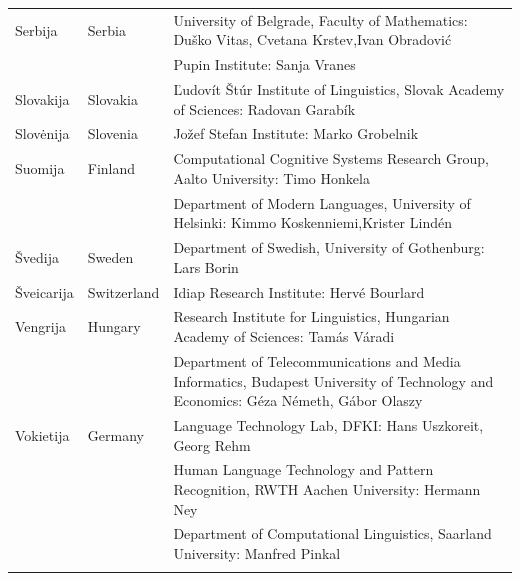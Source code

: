 \begin{longtable}{llp{113mm}}
  Serbija & \textcolor{grey1}{Serbia} & University of Belgrade, Faculty of Mathematics: Duško Vitas, Cvetana Krstev,\newline Ivan Obradović \\ \addlinespace
  & & Pupin Institute: Sanja Vranes \\ \addlinespace
    
  Slovakija & \textcolor{grey1}{Slovakia} &  Ľudovít Štúr Institute of Linguistics, Slovak Academy of Sciences: Radovan Garabík \\ \addlinespace
   
  Slovėnija & \textcolor{grey1}{Slovenia} & Jožef Stefan Institute: Marko Grobelnik \\ \addlinespace
   
 Suomija & \textcolor{grey1}{Finland} & Computational Cognitive Systems Research Group, Aalto University: Timo Honkela\\ \addlinespace
  & & Department of Modern Languages, University of Helsinki: Kimmo Koskenniemi,\newline Krister Lindén \\ \addlinespace
  
  Švedija & \textcolor{grey1}{Sweden} & Department of Swedish, University of Gothenburg: Lars Borin \\ \addlinespace
   
  Šveicarija & \textcolor{grey1}{Switzerland} & Idiap Research Institute: Hervé Bourlard \\ \addlinespace 
   
  Vengrija & \textcolor{grey1}{Hungary} & Research Institute for Linguistics, Hungarian Academy of Sciences: Tamás Váradi\\  \addlinespace
  & & Department of Telecommunications and Media Informatics, Budapest University of Technology and Economics: Géza Németh, Gábor Olaszy\\ \addlinespace
  
  Vokietija & \textcolor{grey1}{Germany} & Language Technology Lab, DFKI: Hans Uszkoreit, Georg Rehm\\ \addlinespace
  & & Human Language Technology and Pattern Recognition, RWTH Aachen University: Hermann Ney \\ \addlinespace
  & & Department of Computational Linguistics, Saarland University: Manfred Pinkal\\ \addlinespace
\end{longtable}
\normalsize

\renewcommand*{\figureformat}{}
\renewcommand*{\captionformat}{}

